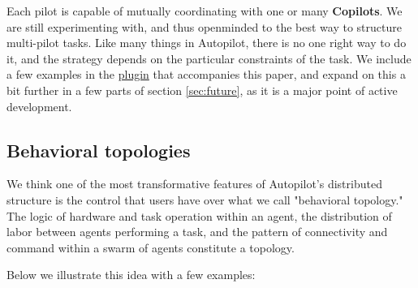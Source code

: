 Each pilot is capable of mutually coordinating with one or many \textbf{Copilots}. We are still experimenting with, and thus openminded to the best way to structure multi-pilot tasks. Like many things in Autopilot, there is no one right way to do it, and the strategy depends on the particular constraints of the task. We include a few examples in the \href{https://wiki.auto-pi-lot.com/index.php/Plugin:Autopilot\_Paper}{plugin} that accompanies this paper, and expand on this a bit further in a few parts of section \ref{sec:future}, as it is a major point of active development.


\subsection{Behavioral topologies}
\label{sec:topology}

We think one of the most transformative features of Autopilot's distributed structure is the control that users have over what we call "behavioral topology." The logic of hardware and task operation within an agent, the distribution of labor between agents performing a task, and the pattern of connectivity and command within a swarm of agents constitute a topology. 

Below we illustrate this idea with a few examples:

\clearpage

